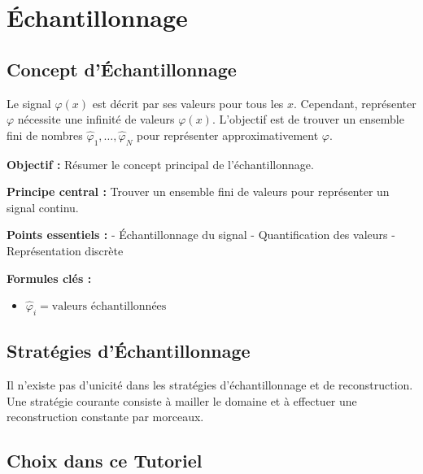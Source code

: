 \documentclass[12pt]{article}
\begin{document}

\section{Échantillonnage}

\subsection{Concept d'Échantillonnage}

Le signal $\varphi(x)$ est décrit par ses valeurs pour tous les $x$. Cependant, représenter $\varphi$ nécessite une infinité de valeurs $\varphi(x)$. L'objectif est de trouver un ensemble fini de nombres $\hat{\varphi}_1, \ldots, \hat{\varphi}_N$ pour représenter approximativement $\varphi$.

\begin{tcolorbox}[colback=red!5!white, colframe=red!75!black, title={\faBookmark\hspace{0.5em}Fiche Récapitulative}]
\textbf{Objectif :} Résumer le concept principal de l'échantillonnage.

\textbf{Principe central :} Trouver un ensemble fini de valeurs pour représenter un signal continu.

\vspace{0.4em}
\textbf{Points essentiels :}  
- Échantillonnage du signal
- Quantification des valeurs
- Représentation discrète

\vspace{0.4em}
\textbf{Formules clés :}  
\begin{itemize}
\item $\hat{\varphi}_i = \text{valeurs échantillonnées}$
\end{itemize}
\end{tcolorbox}

\subsection{Stratégies d'Échantillonnage}

Il n'existe pas d'unicité dans les stratégies d'échantillonnage et de reconstruction. Une stratégie courante consiste à mailler le domaine et à effectuer une reconstruction constante par morceaux.


\subsection{Choix dans ce Tutoriel}
\end{document}
